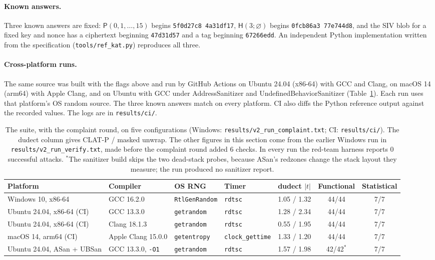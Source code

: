 \documentclass[10pt,a4paper]{article}
\newcommand{\perm}{\mathsf{P}}
\newcommand{\Hash}{\mathsf{H}}
\newcommand{\code}[1]{\texttt{#1}}
\newcommand{\abs}[1]{\left\lvert #1 \right\rvert}
\theoremstyle{definition}
\theoremstyle{remark}
\begin{document}
\paragraph{Known answers.}
Three known answers are fixed: $\perm(0,1,\dots,15)$ begins \code{5f0d27c8 4a31df17}, $\Hash(3;\varnothing)$ begins \code{0fcb86a3 77e744d8}, and the SIV blob for a fixed key and nonce has a ciphertext beginning \code{47d31d57} and a tag beginning \code{67266edd}. An independent Python implementation written from the specification (\code{tools/ref\_kat.py}) reproduces all three.

\paragraph{Cross-platform runs.}
The same source was built with the flags above and run by GitHub Actions on Ubuntu 24.04 (x86-64) with GCC and Clang, on macOS 14 (arm64) with Apple Clang, and on Ubuntu with GCC under AddressSanitizer and UndefinedBehaviorSanitizer (Table~\ref{tab:platforms}). Each run uses that platform's OS random source. The three known answers match on every platform. CI also diffs the Python reference output against the recorded values. The logs are in \code{results/ci/}.

\begin{table}[t]
\centering\footnotesize\setlength{\tabcolsep}{4pt}
\begin{tabular}{@{}lllllcc@{}}
\toprule
Platform & Compiler & OS RNG & Timer & dudect $\abs{t}$ & Functional & Statistical\\
\midrule
Windows 10, x86-64 & GCC 16.2.0 & \code{RtlGenRandom} & \code{rdtsc} & 1.05 / 1.32 & 44/44 & 7/7\\
Ubuntu 24.04, x86-64 (CI) & GCC 13.3.0 & \code{getrandom} & \code{rdtsc} & 1.28 / 2.34 & 44/44 & 7/7\\
Ubuntu 24.04, x86-64 (CI) & Clang 18.1.3 & \code{getrandom} & \code{rdtsc} & 0.55 / 1.95 & 44/44 & 7/7\\
macOS 14, arm64 (CI) & Apple Clang 15.0.0 & \code{getentropy} & \code{clock\_gettime} & 1.33 / 1.20 & 44/44 & 7/7\\
Ubuntu 24.04, ASan + UBSan & GCC 13.3.0, \code{-O1} & \code{getrandom} & \code{rdtsc} & 1.57 / 1.98 & 42/42$^{*}$ & 7/7\\
\bottomrule
\end{tabular}
\caption{The suite, with the complaint round, on five configurations (Windows: \code{results/v2\_run\_complaint.txt}; CI: \code{results/ci/}). The dudect column gives CLAT-P / masked unwrap. The other figures in this section come from the earlier Windows run in \code{results/v2\_run\_verify.txt}, made before the complaint round added 6 checks. In every run the red-team harness reports 0 successful attacks. $^{*}$The sanitizer build skips the two dead-stack probes, because ASan's redzones change the stack layout they measure; the run produced no sanitizer report.}\label{tab:platforms}
\end{table}
\end{document}
